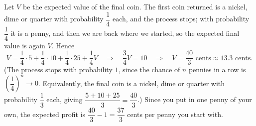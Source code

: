 Let $V$ be the expected value of the final coin. The first coin returned is a nickel, dime or quarter with probability $\dfrac{1}{4}$ each, and the process stops; with probability $\dfrac{1}{4}$ it is a penny, and then we are back where we started, so the expected final value is again $V$. Hence
\[
V=\dfrac{1}{4}\cdot5+\dfrac{1}{4}\cdot10+\dfrac{1}{4}\cdot25+\dfrac{1}{4}V\quad\Longrightarrow\quad\dfrac{3}{4}V=10\quad\Longrightarrow\quad V=\boxed{\dfrac{40}{3}\text{ cents}}\approx13.3\text{ cents}.
\]
(The process stops with probability $1$, since the chance of $n$ pennies in a row is $\left(\dfrac{1}{4}\right)^n\to0$. Equivalently, the final coin is a nickel, dime or quarter with probability $\dfrac{1}{3}$ each, giving $\dfrac{5+10+25}{3}=\dfrac{40}{3}$.) Since you put in one penny of your own, the expected profit is $\dfrac{40}{3}-1=\dfrac{37}{3}$ cents per penny you start with.
